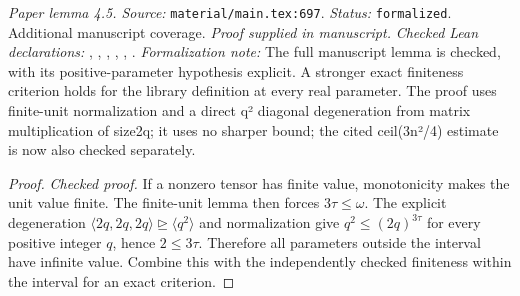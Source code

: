 \noindent\textit{Paper lemma 4.5. Source:} \texttt{material/main.tex:697}.
\textit{Status:} \texttt{formalized}. Additional manuscript coverage.
\textit{Proof supplied in manuscript.}
\textit{Checked Lean declarations:} , , , , , .
\textit{Formalization note:} The full manuscript lemma is checked, with its positive-parameter hypothesis explicit. A stronger exact finiteness criterion holds for the library definition at every real parameter. The proof uses finite-unit normalization and a direct q² diagonal degeneration from matrix multiplication of size2q; it uses no sharper bound; the cited ceil(3n²/4) estimate is now also checked separately.

\begin{proof}
\leanok
{}
\textit{Checked proof.} If a nonzero tensor has finite value, monotonicity makes the unit value finite. The finite-unit lemma then forces $3\tau\le\omega$. The explicit degeneration $\langle2q,2q,2q\rangle\trianglerighteq\langle q^2\rangle$ and normalization give $q^2\le(2q)^{3\tau}$ for every positive integer $q$, hence $2\le3\tau$. Therefore all parameters outside the interval have infinite value. Combine this with the independently checked finiteness within the interval for an exact criterion.
\end{proof}

